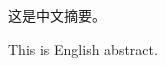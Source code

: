 \makectitlepage

\begin{cabstract}
这是中文摘要。
\end{cabstract}

\begin{eabstract}
This is English abstract.
\end{eabstract}

\frontmatter
{}

\maketoc

\mainmatter
